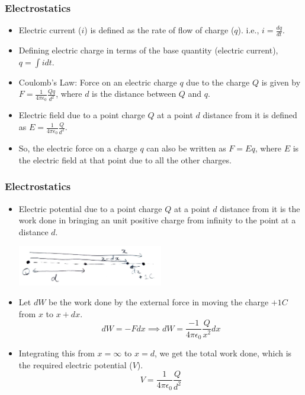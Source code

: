\documentclass[10pt]{beamer}
\begin{document}
\begin{frame}
    \frametitle{Electrostatics}
    \begin{itemize}
        \item Electric current ($i$) is defined as the rate of flow of charge ($q$). i.e., $i = \frac{dq}{dt}$.
        \item Defining electric charge in terms of the base quantity (electric current), $q = \int i dt$.
        \item Coulomb's Law: Force on an electric charge $q$ due to the charge $Q$ is given by $F = \frac{1}{4\pi\epsilon_0} \frac{Qq}{d^2}$, where $d$ is the distance between $Q$ and $q$.
        \item Electric field due to a point charge $Q$ at a point $d$ distance from it is defined as $E = \frac{1}{4\pi\epsilon_0} \frac{Q}{d^2}$.
        \item So, the electric force on a charge $q$ can also be written as $F = E q$, where $E$ is the electric field at that point due to all the other charges.
    \end{itemize}
\end{frame}

\begin{frame}
    \frametitle{Electrostatics}
    \begin{itemize}
        \item Electric potential due to a point charge $Q$ at a point $d$ distance from it is the work done in bringing an unit positive charge from infinity to the point at a distance $d$.

        \begin{center}
            \includegraphics[height=0.2\textheight,width=0.5\textwidth]{images/electrostats_potential.jpeg}
        \end{center}
        \item Let $dW$ be the work done by the external force in moving the charge $+1C$ from $x$ to $x+dx$.
            $$
            dW = -F dx \implies dW = \frac{-1}{4\pi\epsilon_0} \frac{Q}{x^2} dx
            $$
        \item Integrating this from $x = \infty$ to $x = d$, we get the total work done, which is the required electric potential ($V$).
            $$
            V = \frac{1}{4\pi\epsilon_0} \frac{Q}{d^2}
            $$
    \end{itemize}
\end{frame}
\end{document}
